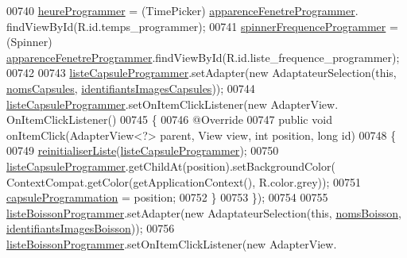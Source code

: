 \begin{DoxyCode}
00740         \hyperlink{classcom_1_1example_1_1ekawa_1_1_ihm_ac6f46062030a20efac18673970d37547}{heureProgrammer} = (TimePicker) \hyperlink{classcom_1_1example_1_1ekawa_1_1_ihm_aa8beb9a05b4f2c2030b9829642f87d3f}{apparenceFenetreProgrammer}.
      findViewById(R.id.temps\_programmer);
00741         \hyperlink{classcom_1_1example_1_1ekawa_1_1_ihm_ab266576a3855dbd6e36e346ddb27247a}{spinnerFrequenceProgrammer} = (Spinner) 
      \hyperlink{classcom_1_1example_1_1ekawa_1_1_ihm_aa8beb9a05b4f2c2030b9829642f87d3f}{apparenceFenetreProgrammer}.findViewById(R.id.liste\_frequence\_programmer);
00742 
00743         \hyperlink{classcom_1_1example_1_1ekawa_1_1_ihm_adfeb58df0ce9fa2088a7a708a54ffe07}{listeCapsuleProgrammer}.setAdapter(\textcolor{keyword}{new} AdaptateurSelection(\textcolor{keyword}{this}, 
      \hyperlink{classcom_1_1example_1_1ekawa_1_1_ihm_a9d61b7bfd998d449bb405dcf5e6e4e89}{nomsCapsules}, \hyperlink{classcom_1_1example_1_1ekawa_1_1_ihm_af35b42764d9f7b10c8bc0e210c3ba76d}{identifiantsImagesCapsules}));
00744         \hyperlink{classcom_1_1example_1_1ekawa_1_1_ihm_adfeb58df0ce9fa2088a7a708a54ffe07}{listeCapsuleProgrammer}.setOnItemClickListener(\textcolor{keyword}{new} AdapterView.
      OnItemClickListener()
00745         \{
00746             @Override
00747             \textcolor{keyword}{public} \textcolor{keywordtype}{void} onItemClick(AdapterView<?> parent, View view, \textcolor{keywordtype}{int} position, \textcolor{keywordtype}{long} \textcolor{keywordtype}{id})
00748             \{
00749                 \hyperlink{classcom_1_1example_1_1ekawa_1_1_ihm_a4c6ea5a7de9f8fc5c820fa4c8ce14838}{reinitialiserListe}(\hyperlink{classcom_1_1example_1_1ekawa_1_1_ihm_adfeb58df0ce9fa2088a7a708a54ffe07}{listeCapsuleProgrammer});
00750                 \hyperlink{classcom_1_1example_1_1ekawa_1_1_ihm_adfeb58df0ce9fa2088a7a708a54ffe07}{listeCapsuleProgrammer}.getChildAt(position).setBackgroundColor(
      ContextCompat.getColor(getApplicationContext(), R.color.grey));
00751                 \hyperlink{classcom_1_1example_1_1ekawa_1_1_ihm_a2ddf5b95e2a3fbb3a15d160ba266295a}{capsuleProgrammation} = position;
00752             \}
00753         \});
00754 
00755         \hyperlink{classcom_1_1example_1_1ekawa_1_1_ihm_a8badf9f0485d205f8a379e54b01deab7}{listeBoissonProgrammer}.setAdapter(\textcolor{keyword}{new} AdaptateurSelection(\textcolor{keyword}{this}, 
      \hyperlink{classcom_1_1example_1_1ekawa_1_1_ihm_abafa700d1d1f943bd3e9678f698ed33a}{nomsBoisson}, \hyperlink{classcom_1_1example_1_1ekawa_1_1_ihm_aab3ed36de15018dd29af2df4b3e150e4}{identifiantsImagesBoisson}));
00756         \hyperlink{classcom_1_1example_1_1ekawa_1_1_ihm_a8badf9f0485d205f8a379e54b01deab7}{listeBoissonProgrammer}.setOnItemClickListener(\textcolor{keyword}{new} AdapterView.

\end{DoxyCode}
